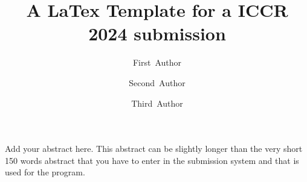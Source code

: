 \documentclass[11pt,twocolumn,twoside]{article}
\begin{document}
\title{A LaTex Template for a ICCR 2024 submission} 

\author[1]{First~Author}
\author[1,2]{Second~Author}
\author[2]{Third~Author}



\maketitle
\thispagestyle{fancy}





\begin{customabstract}
Add your abstract here. This abstract can be slightly longer than the very short 150 words abstract that you have to enter in the submission system and that is used for the program. 
\end{customabstract}






\printbibliography
\end{document}
